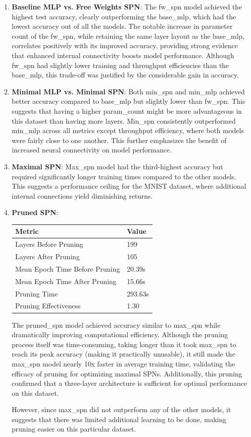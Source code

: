 \begin{enumerate}
\item \textbf{Baseline MLP vs. Free Weights SPN}: The fw\_spn model achieved the highest test accuracy, clearly outperforming the base\_mlp, which had the lowest accuracy out of all the models. The notable increase in parameter count of the fw\_spn, while retaining the same layer layout as the base\_mlp, correlates positively with its improved accuracy, providing strong evidence that enhanced internal connectivity boosts model performance. Although fw\_spn had slightly lower training and throughput efficiencies than the base\_mlp, this trade-off was justified by the considerable gain in accuracy.
\item \textbf{Minimal MLP vs. Minimal SPN}: Both min\_spn and min\_mlp achieved better accuracy compared to base\_mlp but slightly lower than fw\_spn. This suggests that having a higher param\_count might be more advantageous in this dataset than having more layers. Min\_spn consistently outperformed min\_mlp across all metrics except throughput efficiency, where both models were fairly close to one another. This further emphasizes the benefit of increased neural connectivity on model performance.
\item \textbf{Maximal SPN}: Max\_spn model had the third-highest accuracy but required significantly longer training times compared to the other models. This suggests a performance ceiling for the MNIST dataset, where additional internal connections yield diminishing returns.
\item \textbf{Pruned SPN}:
\begin{center}  %
\begin{tabular}{|l|l|}
\hline
\textbf{Metric} & \textbf{Value} \\
\hline
Layers Before Pruning & 199 \\
Layers After Pruning & 105 \\
Mean Epoch Time Before Pruning & 20.39s \\
Mean Epoch Time After Pruning & 15.66s \\
Pruning Time & 293.63s \\
Pruning Effectiveness & 1.30 \\
\hline
\end{tabular}
\end{center}
The pruned\_spn model achieved accuracy similar to max\_spn while dramatically improving computational efficiency. Although the pruning process itself was time-consuming, taking longer than it took max\_spn to reach its peak accuracy (making it practically unusable), it still made the max\_spn model nearly 10x faster in average training time, validating the efficacy of pruning for optimizing maximal SPNs. Additionally, this pruning confirmed that a three-layer architecture is sufficient for optimal performance on this dataset. 

However, since max\_spn did not outperform any of the other models, it suggests that there was limited additional learning to be done, making pruning easier on this particular dataset.
\end{enumerate}


